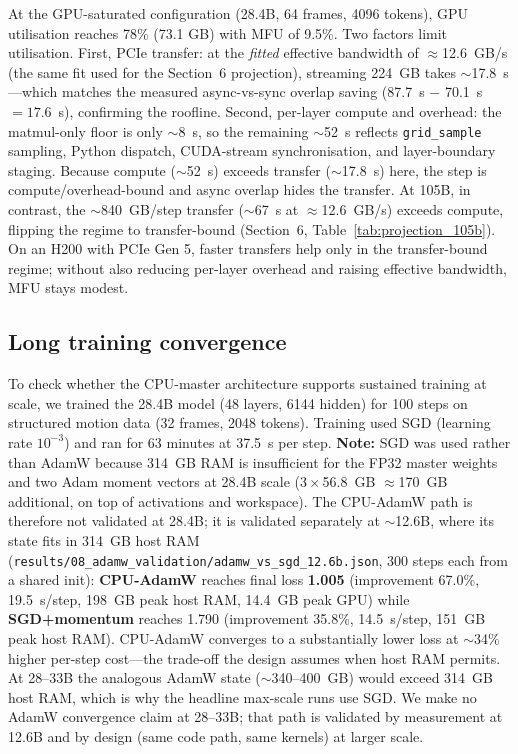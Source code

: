 \documentclass[11pt, letterpaper]{article}
\begin{document}
At the GPU-saturated configuration (28.4B, 64 frames, 4096 tokens), GPU utilisation reaches 78\% (73.1 GB) with MFU of 9.5\%. Two factors limit utilisation. First, PCIe transfer: at the \emph{fitted} effective bandwidth of $\approx$12.6~GB/s (the same fit used for the Section~6 projection), streaming 224~GB takes $\sim$17.8~s---which matches the measured async-vs-sync overlap saving (87.7~s $-$ 70.1~s $= 17.6$~s), confirming the roofline. Second, per-layer compute and overhead: the matmul-only floor is only $\sim$8~s, so the remaining $\sim$52~s reflects \texttt{grid\_sample} sampling, Python dispatch, CUDA-stream synchronisation, and layer-boundary staging. Because compute ($\sim$52~s) exceeds transfer ($\sim$17.8~s) here, the step is compute/overhead-bound and async overlap hides the transfer. At 105B, in contrast, the $\sim$840~GB/step transfer ($\sim$67~s at $\approx$12.6~GB/s) exceeds compute, flipping the regime to transfer-bound (Section~6, Table~\ref{tab:projection_105b}). On an H200 with PCIe Gen 5, faster transfers help only in the transfer-bound regime; without also reducing per-layer overhead and raising effective bandwidth, MFU stays modest.

\subsection{Long training convergence}

To check whether the CPU-master architecture supports sustained training at scale, we trained the 28.4B model (48 layers, 6144 hidden) for 100 steps on structured motion data (32 frames, 2048 tokens). Training used SGD (learning rate $10^{-3}$) and ran for 63 minutes at 37.5~s per step. \textbf{Note:} SGD was used rather than AdamW because 314~GB RAM is insufficient for the FP32 master weights and two Adam moment vectors at 28.4B scale ($3\times$56.8~GB $\approx$170~GB additional, on top of activations and workspace). The CPU-AdamW path is therefore not validated at 28.4B; it is validated separately at $\sim$12.6B, where its state fits in 314~GB host RAM (\texttt{results/08\_adamw\_validation/adamw\_vs\_sgd\_12.6b.json}, 300 steps each from a shared init): \textbf{CPU-AdamW} reaches final loss \textbf{1.005} (improvement 67.0\%, 19.5~s/step, 198~GB peak host RAM, 14.4~GB peak GPU) while \textbf{SGD+momentum} reaches 1.790 (improvement 35.8\%, 14.5~s/step, 151~GB peak host RAM). CPU-AdamW converges to a substantially lower loss at $\sim$34\% higher per-step cost---the trade-off the design assumes when host RAM permits. At 28--33B the analogous AdamW state ($\sim$340--400~GB) would exceed 314~GB host RAM, which is why the headline max-scale runs use SGD. We make no AdamW convergence claim at 28--33B; that path is validated by measurement at 12.6B and by design (same code path, same kernels) at larger scale.
\end{document}
